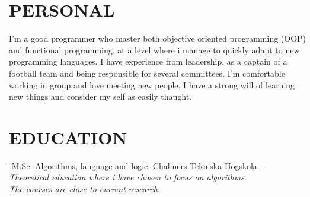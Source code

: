 \documentclass[11pt]{res}
\begin{document}
\begin{resume}
\section{PERSONAL}
I'm a good programmer who master both objective oriented programming (OOP) and functional programming, at a level where i manage to quickly adapt to new programming languages. I have experience from leadership, as a captain of a football team and being responsible for several committees. I'm comfortable working in group and love meeting new people. I have a strong will of learning new things and consider my self as easily thaught. 

\section{EDUCATION}          
\vspace{-0.1in}	

	\begin{tabbing}
		\hspace{2.3in}\= \hspace{2.6in}\= \kill
		    M.Sc. Algorithms, language and logic, Chalmers Tekniska Högskola  \>  - \\
		\textit{Theoretical education where i have chosen to focus on algorithms. } \\
	        \textit{The courses are close to current research.}
	\end{tabbing}

\vspace{-20pt}


\end{resume}
\end{document}
